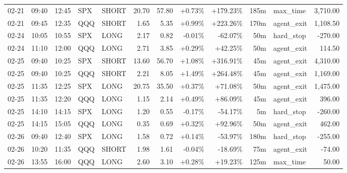 \documentclass[11pt,a4paper,twoside]{article}
\begin{document}
\begin{center}
\begin{longtable}{>{\color{txtmain}}l l l l l r r r r r >{\color{txtmain}}l r}
02-21 & 09:40 & 12:45 & SPX & SHORT & 20.70 & 57.80 & \textcolor{wingreen}{+0.73\%} & \textcolor{wingreen}{+179.23\%} & 185m & max\_time & \textcolor{wingreen}{3,710.00} \\
02-21 & 09:45 & 12:35 & QQQ & SHORT & 1.65 & 5.35 & \textcolor{wingreen}{+0.99\%} & \textcolor{wingreen}{+223.26\%} & 170m & agent\_exit & \textcolor{wingreen}{1,108.50} \\
02-24 & 10:05 & 10:55 & SPX & LONG & 2.17 & 0.82 & \textcolor{lossred}{-0.01\%} & \textcolor{lossred}{-62.07\%} & 50m & hard\_stop & \textcolor{lossred}{-270.00} \\
02-24 & 11:10 & 12:00 & QQQ & LONG & 2.71 & 3.85 & \textcolor{wingreen}{+0.29\%} & \textcolor{wingreen}{+42.25\%} & 50m & agent\_exit & \textcolor{wingreen}{114.50} \\
02-25 & 09:40 & 10:25 & SPX & SHORT & 13.60 & 56.70 & \textcolor{wingreen}{+1.08\%} & \textcolor{wingreen}{+316.91\%} & 45m & agent\_exit & \textcolor{wingreen}{4,310.00} \\
02-25 & 09:40 & 10:25 & QQQ & SHORT & 2.21 & 8.05 & \textcolor{wingreen}{+1.49\%} & \textcolor{wingreen}{+264.48\%} & 45m & agent\_exit & \textcolor{wingreen}{1,169.00} \\
02-25 & 11:35 & 12:25 & SPX & LONG & 20.75 & 35.50 & \textcolor{wingreen}{+0.37\%} & \textcolor{wingreen}{+71.08\%} & 50m & agent\_exit & \textcolor{wingreen}{1,475.00} \\
02-25 & 11:35 & 12:20 & QQQ & LONG & 1.15 & 2.14 & \textcolor{wingreen}{+0.49\%} & \textcolor{wingreen}{+86.09\%} & 45m & agent\_exit & \textcolor{wingreen}{396.00} \\
02-25 & 14:10 & 14:15 & SPX & LONG & 1.20 & 0.55 & \textcolor{lossred}{-0.17\%} & \textcolor{lossred}{-54.17\%} & 5m & hard\_stop & \textcolor{lossred}{-260.00} \\
02-25 & 14:15 & 15:05 & QQQ & LONG & 0.35 & 0.69 & \textcolor{wingreen}{+0.32\%} & \textcolor{wingreen}{+92.96\%} & 50m & agent\_exit & \textcolor{wingreen}{462.00} \\
02-26 & 09:40 & 12:40 & SPX & LONG & 1.58 & 0.72 & \textcolor{wingreen}{+0.14\%} & \textcolor{lossred}{-53.97\%} & 180m & hard\_stop & \textcolor{lossred}{-255.00} \\
02-26 & 10:20 & 11:35 & QQQ & SHORT & 1.98 & 1.61 & \textcolor{lossred}{-0.04\%} & \textcolor{lossred}{-18.69\%} & 75m & agent\_exit & \textcolor{lossred}{-74.00} \\
02-26 & 13:55 & 16:00 & QQQ & LONG & 2.60 & 3.10 & \textcolor{wingreen}{+0.28\%} & \textcolor{wingreen}{+19.23\%} & 125m & max\_time & \textcolor{wingreen}{50.00} \\

\end{longtable}
\end{center}
\end{document}
